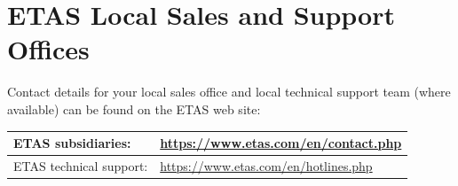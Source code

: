 \vfill

\section{ETAS Local Sales and Support Offices}
Contact details for your local sales office and local technical support team (where available) can be found on the ETAS web site:

\begin{tabular}{ | p{6.9cm} | p{8cm} | }
	\hline
	ETAS subsidiaries: & \url{https://www.etas.com/en/contact.php} \\ \hline
	ETAS technical support: & \url{https://www.etas.com/en/hotlines.php} \\ 
	\hline
\end{tabular}
\vfill